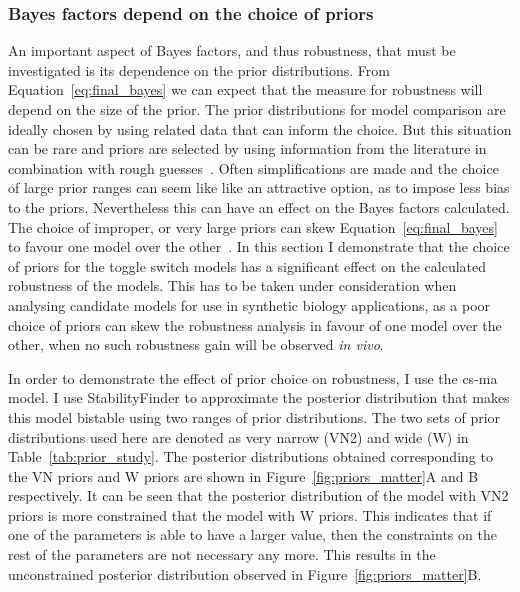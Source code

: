 \subsubsection{Bayes factors depend on the choice of priors}

An important aspect of Bayes factors, and thus robustness, that must be investigated is its dependence on the prior distributions. From Equation~\ref{eq:final_bayes} we can expect that the measure for robustness will depend on the size of the prior. The prior distributions for model comparison are ideally chosen by using related data that can inform the choice. But this situation can be rare and priors are selected by using information from the literature in combination with rough guesses~\autocite{Kass:1995eh}. Often simplifications are made and the choice of large prior ranges can seem like like an attractive option, as to impose less bias to the priors. Nevertheless this can have an effect on the Bayes factors calculated. The choice of improper, or very large priors can skew Equation~\ref{eq:final_bayes} to favour one model over the other~\autocite{Kass:1995eh}. In this section I demonstrate that the choice of priors for the toggle switch models has a significant effect on the calculated robustness of the models. This has to be taken under consideration when analysing candidate models for use in synthetic biology applications, as a poor choice of priors can skew the robustness analysis in favour of one model over the other, when no such robustness gain will be observed \textit{in vivo}.    

In order to demonstrate the effect of prior choice on robustness, I use the \acrshort{cs-ma} model. I use StabilityFinder to approximate the posterior distribution that makes this model bistable using two ranges of prior distributions. The two sets of prior distributions used here are denoted as very narrow (VN2) and wide (W) in Table~\ref{tab:prior_study}. The posterior distributions obtained corresponding to the VN priors and W priors are shown in Figure~\ref{fig:priors_matter}A and B respectively. It can be seen that the posterior distribution of the model with VN2 priors is more constrained that the model with W priors. This indicates that if one of the parameters is able to have a larger value, then the constraints on the rest of the parameters are not necessary any more. This results in the unconstrained posterior distribution observed in Figure~\ref{fig:priors_matter}B.


